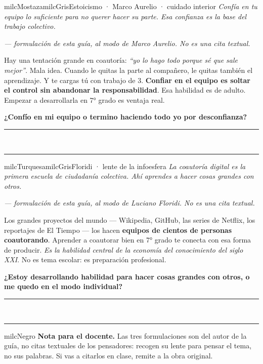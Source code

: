 \documentclass[11pt,letterpaper]{article}
\newcommand{\linead}[1]{\noindent\color{milcLinea}\rule{#1}{0.5pt}\color{milcNegro}}
\begin{document}
\begin{softbox}{milcMostaza}{milcGris}{Estoicismo · Marco Aurelio · cuidado interior}
\textit{Confía en tu equipo lo suficiente para no querer hacer su parte. Esa confianza es la base del trabajo colectivo.}

{\footnotesize\itshape\color{milcNegro!70}--- formulación de esta guía, al modo de Marco Aurelio. No es una cita textual.}

Hay una tentación grande en coautoría: \emph{``yo lo hago todo porque sé que sale mejor''}. Mala idea. Cuando le quitas la parte al compañero, le quitas también el aprendizaje. Y te cargas tú con trabajo de 3. \textbf{Confiar en el equipo es soltar el control sin abandonar la responsabilidad}. Esa habilidad es de adulto. Empezar a desarrollarla en 7° grado es ventaja real.

\textbf{¿Confío en mi equipo o termino haciendo todo yo por desconfianza?}
\end{softbox}
\linead{\linewidth}\\[1mm]
\linead{\linewidth}

\begin{softbox}{milcTurquesa}{milcGris}{Floridi · lente de la infoesfera}
\textit{La coautoría digital es la primera escuela de ciudadanía colectiva. Ahí aprendes a hacer cosas grandes con otros.}

{\footnotesize\itshape\color{milcNegro!70}--- formulación de esta guía, al modo de Luciano Floridi. No es una cita textual.}

Los grandes proyectos del mundo --- Wikipedia, GitHub, las series de Netflix, los reportajes de El Tiempo --- los hacen \textbf{equipos de cientos de personas coautorando}. Aprender a coautorar bien en 7° grado te conecta con esa forma de producir. \emph{Es la habilidad central de la economía del conocimiento del siglo XXI}. No es tema escolar: es preparación profesional.

\textbf{¿Estoy desarrollando habilidad para hacer cosas grandes con otros, o me quedo en el modo individual?}
\end{softbox}
\linead{\linewidth}\\[1mm]
\linead{\linewidth}

\begin{infoband}{milcNegro}
\textbf{Nota para el docente.} Las tres formulaciones son del autor de la guía, no citas textuales de los pensadores: recogen su lente para pensar el tema, no sus palabras. Si vas a citarlos en clase, remite a la obra original.
\end{infoband}
\end{document}
